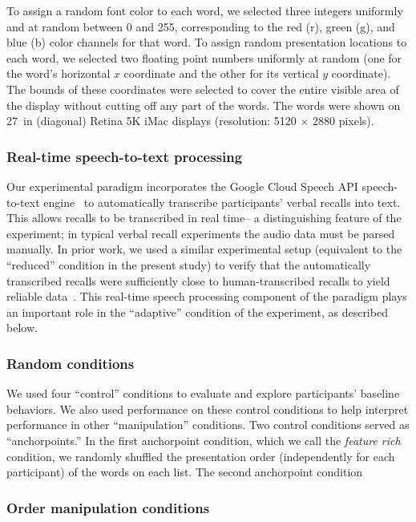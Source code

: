 \documentclass[11pt]{article}
\begin{document}
To assign a random font color to each word, we selected three integers
uniformly and at random between 0 and 255, corresponding to the red (r), green
(g), and blue (b) color channels for that word. To assign random presentation
locations to each word, we selected two floating point numbers uniformly at
random (one for the word's horizontal $x$ coordinate and the other for its
vertical $y$ coordinate).  The bounds of these coordinates were selected to cover the entire
visible area of the display without cutting off any part of the words.  The words were shown
on 27~in (diagonal) Retina 5K iMac displays (resolution: 5120 $\times$ 2880 pixels).


\subsubsection*{Real-time speech-to-text processing}

Our experimental paradigm incorporates the Google Cloud Speech API
speech-to-text engine~\citep{HalpEtal16} to automatically transcribe
participants' verbal recalls into text. This allows recalls to be transcribed
in real time-- a distinguishing feature of the experiment; in typical verbal
recall experiments the audio data must be parsed manually. In prior work, we
used a similar experimental setup (equivalent to the ``reduced'' condition in
the present study) to verify that the automatically transcribed recalls were
sufficiently close to human-transcribed recalls to yield reliable
data~\citep{ZimaEtal18}. This real-time speech processing component of the
paradigm plays an important role in the ``adaptive'' condition of the
experiment, as described below.

\subsubsection*{Random conditions}

We used four ``control'' conditions to evaluate and explore participants'
baseline behaviors. We also used performance on these control conditions to
help interpret performance in other ``manipulation'' conditions. Two control
conditions served as ``anchorpoints.'' In the first anchorpoint condition,
which we call the \textit{feature rich} condition, we randomly shuffled the
presentation order (independently for each participant) of the words on each
list. The second anchorpoint condition 


\subsubsection*{Order manipulation conditions}
\end{document}
